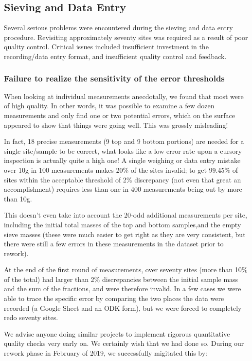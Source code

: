 \documentclass[a4paper,12pt,twoside]{article}
\begin{document}
\color{RHblue}
\subsection{Sieving and Data Entry}

\color{RHgrey}
Several serious problems were encountered during the sieving and data entry procedure. Revisiting approximately seventy sites was required as a result of poor quality control. Critical issues included insufficient investment in the recording/data entry format, and insufficient quality control and feedback.

\color{RHblue}
\subsubsection{Failure to realize the sensitivity of the error thresholds}
\color{RHgrey}
When looking at individual measurements anecdotally, we found that most were of high quality. In other words, it was possible to examine a few dozen measurements and only find one or two potential errors, which on the surface appeared to show that things were going well. This was grossly misleading!

In fact, 18 precise measurements (9 top and 9 bottom portions) are needed for a single site/sample to be correct, what looks like a low error rate upon a cursory inspection is actually quite a high one! A single weighing or data entry mistake over 10g in 100 measurements makes 20\% of the sites invalid; to get 99.45\% of sites within the acceptable threshold of 2\% discrepancy (not even that great an accomplishment) requires less than one in 400 measurements being out by more than 10g. 

This doesn't even take into account the 20-odd additional measurements per site, including the initial total masses of the top and bottom samples,and the empty sieve masses (these were much easier to get right as they are very consistent, but there were still a few errors in these measurements in the dataset prior to rework).

At the end of the first round of measurements, over seventy sites (more than 10\% of the total) had larger than 2\% discrepancies between the initial sample mass and the sum of the fractions, and were therefore invalid. In a few cases we were able to trace the specific error by comparing the two places the data were recorded (a Google Sheet and an ODK form), but we were forced to completely redo seventy sites.

We advise anyone doing similar projects to implement rigorous quantitative quality checks very early on. We certainly wish that we had done so. During our rework phase in February of 2019, we successfully migitated this by:
\end{document}
